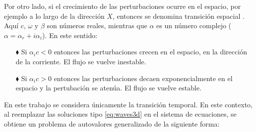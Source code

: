 Por otro lado, si el crecimiento de las perturbaciones ocurre en el espacio, por ejemplo a lo largo de la dirección $X$, entonces se denomina transición espacial \cite{machaca2024}. Aquí $c$, $\omega$ y $\beta$ son números reales, mientras que $\alpha$ es un número complejo ($\alpha = \alpha_r + i \alpha_i$). En este sentido:

\begin{itemize}
\item[$\blacklozenge$] Si $\alpha_i c < 0$ entonces las perturbaciones crecen en el espacio, en la dirección de la \linebreak corriente. El flujo se vuelve inestable.

\item[$\blacklozenge$] Si $\alpha_i c > 0$ entonces las perturbaciones decaen exponencialmente en el espacio y la pertubación se atenúa. El flujo se vuelve estable.
\end{itemize}


En este trabajo se considera únicamente la transición temporal. En este contexto, al reemplazar las soluciones tipo \ref{eq:waves3d} en el sistema de ecuaciones, se obtiene un problema de autovalores generalizado de la siguiente forma:

%
%




